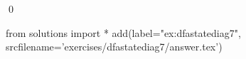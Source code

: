 
\begin{ex} 
  \label{ex:dfastatediag7}
  
  \qed
\end{ex} 
\begin{python0}
from solutions import *
add(label="ex:dfastatediag7",
    srcfilename='exercises/dfastatediag7/answer.tex') 
\end{python0}

